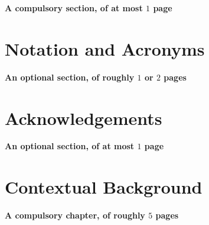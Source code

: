\documentclass[ %
                    author={Alexander Dalton},
                supervisor={Prof. Seth Bullock},
                    degree={MEng},
                     title={Exploring Evolutionary Hardware:},
                  subtitle={Evolved Binary Arithmetic Circuits and Dynamic Problems},
                      type={research},
                      year={2018} ]{dissertation}
\begin{document}
{\bf \color{red}A compulsory section, of at most $1$ page}
\vspace{1cm} 




\chapter*{Notation and Acronyms}

{\bf \color{red}An optional section, of roughly $1$ or $2$ pages}
\vspace{1cm} 




\chapter*{Acknowledgements}

{\bf \color{red}An optional section, of at most $1$ page}
\vspace{1cm} 



%

\mainmatter


\chapter{Contextual Background}
\label{chap:context}

{\bf \color{red}A compulsory chapter,     of roughly $5$ pages}
\vspace{1cm} 
\end{document}
